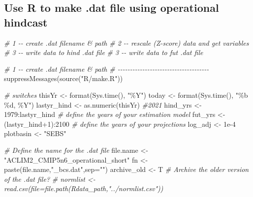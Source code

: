 \documentclass[
]{article}
\newenvironment{Shaded}{\begin{snugshade}}{\end{snugshade}}
\newcommand{\AttributeTok}[1]{\textcolor[rgb]{0.77,0.63,0.00}{#1}}
\newcommand{\CommentTok}[1]{\textcolor[rgb]{0.56,0.35,0.01}{\textit{#1}}}
\newcommand{\DecValTok}[1]{\textcolor[rgb]{0.00,0.00,0.81}{#1}}
\newcommand{\FloatTok}[1]{\textcolor[rgb]{0.00,0.00,0.81}{#1}}
\newcommand{\FunctionTok}[1]{\textcolor[rgb]{0.00,0.00,0.00}{#1}}
\newcommand{\NormalTok}[1]{#1}
\newcommand{\OtherTok}[1]{\textcolor[rgb]{0.56,0.35,0.01}{#1}}
\newcommand{\SpecialCharTok}[1]{\textcolor[rgb]{0.00,0.00,0.00}{#1}}
\newcommand{\StringTok}[1]{\textcolor[rgb]{0.31,0.60,0.02}{#1}}
\begin{document}
\hypertarget{use-r-to-make-.dat-file-using-operational-hindcast}{%
\subsection{Use R to make .dat file using operational
hindcast}\label{use-r-to-make-.dat-file-using-operational-hindcast}}

\begin{Shaded}
\begin{Highlighting}[]
  \CommentTok{\# 1 {-}{-} create .dat filename \& path}
  \CommentTok{\# 2 {-}{-} rescale (Z{-}score) data and get variables}
  \CommentTok{\# 3 {-}{-} write data to hind .dat file}
  \CommentTok{\# 3 {-}{-} write data to fut  .dat file}
  
  \CommentTok{\# 1 {-}{-} create .dat filename \& path}
  \CommentTok{\# {-}{-}{-}{-}{-}{-}{-}{-}{-}{-}{-}{-}{-}{-}{-}{-}{-}{-}{-}{-}{-}{-}{-}{-}{-}{-}{-}{-}{-}{-}{-}{-}{-}{-}{-}{-}{-}}
  \FunctionTok{suppressMessages}\NormalTok{(}\FunctionTok{source}\NormalTok{(}\StringTok{"R/make.R"}\NormalTok{))}

  
  \CommentTok{\# switches }
\NormalTok{    thisYr }\OtherTok{\textless{}{-}} \FunctionTok{format}\NormalTok{(}\FunctionTok{Sys.time}\NormalTok{(), }\StringTok{"\%Y"}\NormalTok{)}
\NormalTok{    today  }\OtherTok{\textless{}{-}} \FunctionTok{format}\NormalTok{(}\FunctionTok{Sys.time}\NormalTok{(), }\StringTok{"\%b \%d, \%Y"}\NormalTok{)}
\NormalTok{    lastyr\_hind }\OtherTok{\textless{}{-}} \FunctionTok{as.numeric}\NormalTok{(thisYr)  }\CommentTok{\#2021}
\NormalTok{    hind\_yrs    }\OtherTok{\textless{}{-}} \DecValTok{1979}\SpecialCharTok{:}\NormalTok{lastyr\_hind   }\CommentTok{\# define the years of your estimation model}
\NormalTok{    fut\_yrs     }\OtherTok{\textless{}{-}}\NormalTok{ (lastyr\_hind}\SpecialCharTok{+}\DecValTok{1}\NormalTok{)}\SpecialCharTok{:}\DecValTok{2100}   \CommentTok{\# define the years of your projections}
\NormalTok{    log\_adj     }\OtherTok{\textless{}{-}} \FloatTok{1e{-}4}
\NormalTok{    plotbasin   }\OtherTok{\textless{}{-}} \StringTok{"SEBS"}  
  
  \CommentTok{\# Define the name for the .dat file}
\NormalTok{    file.name   }\OtherTok{\textless{}{-}} \StringTok{"ACLIM2\_CMIP5n6\_operational\_short"}
\NormalTok{    fn          }\OtherTok{\textless{}{-}} \FunctionTok{paste}\NormalTok{(file.name,}\StringTok{"\_bcs.dat"}\NormalTok{,}\AttributeTok{sep=}\StringTok{""}\NormalTok{)}
\NormalTok{    archive\_old }\OtherTok{\textless{}{-}}\NormalTok{ T  }\CommentTok{\# Archive the older version of the .dat file?}
   \CommentTok{\# normlist    \textless{}{-} read.csv(file=file.path(Rdata\_path,"../normlist.csv"))}
    

\end{Highlighting}
\end{Shaded}
\end{document}
